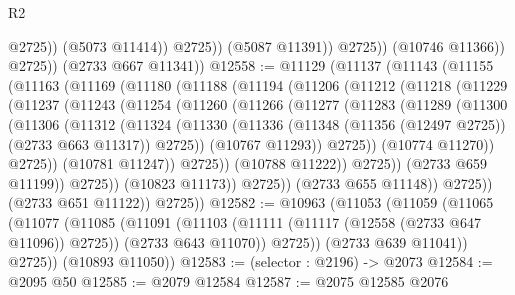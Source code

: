 \begin{lexlean}{R2}
\begin{coremodule}
                            @2725))
                        (@5073 @11414))
                      @2725))
                  (@5087 @11391))
                @2725))
            (@10746 @11366))
          @2725))
      (@2733 @667 @11341))
@12558 := @11129
    (@11137
      (@11143
        (@11155
          (@11163
            (@11169
              (@11180
                (@11188
                  (@11194
                    (@11206
                      (@11212
                        (@11218
                          (@11229
                            (@11237
                              (@11243
                                (@11254
                                  (@11260
                                    (@11266
                                      (@11277
                                        (@11283
                                          (@11289
                                            (@11300
                                              (@11306
                                                (@11312
                                                  (@11324
                                                    (@11330
                                                      (@11336
                                                        (@11348
                                                          (@11356 (@12497 @2725))
                                                          (@2733 @663 @11317))
                                                        @2725))
                                                    (@10767 @11293))
                                                  @2725))
                                              (@10774 @11270))
                                            @2725))
                                        (@10781 @11247))
                                      @2725))
                                  (@10788 @11222))
                                @2725))
                            (@2733 @659 @11199))
                          @2725))
                      (@10823 @11173))
                    @2725))
                (@2733 @655 @11148))
              @2725))
          (@2733 @651 @11122))
        @2725))
@12582 := @10963
    (@11053
      (@11059
        (@11065
          (@11077
            (@11085
              (@11091
                (@11103 (@11111 (@11117 (@12558 (@2733 @647 @11096)) @2725)) (@2733 @643 @11070))
                @2725))
            (@2733 @639 @11041))
          @2725))
      (@10893 @11050))
@12583 := (selector : @2196) -> @2073
@12584 := @2095 @50
@12585 := @2079 @12584
@12587 := @2075 @12585 @2076

\end{coremodule}
\end{lexlean}
